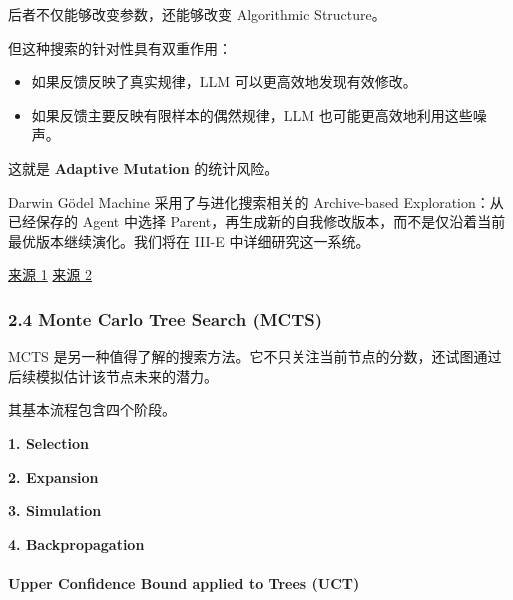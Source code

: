 后者不仅能够改变参数，还能够改变 Algorithmic Structure。

但这种搜索的针对性具有双重作用：

\begin{itemize}
\tightlist
\item
  如果反馈反映了真实规律，LLM 可以更高效地发现有效修改。
\item
  如果反馈主要反映有限样本的偶然规律，LLM 也可能更高效地利用这些噪声。
\end{itemize}

这就是 \textbf{Adaptive Mutation} 的统计风险。

Darwin Gödel Machine 采用了与进化搜索相关的 Archive-based Exploration：从已经保存的 Agent 中选择 Parent，再生成新的自我修改版本，而不是仅沿着当前最优版本继续演化。我们将在 III-E 中详细研究这一系统。

\href{https://arxiv.org/abs/2505.22954}{来源 1} \href{https://openreview.net/pdf?id=pUpzQZTvGY}{来源 2}

\hypertarget{part-3-40-0001-monte-carlo-tree-search-mcts}{%
\subsubsection{2.4 Monte Carlo Tree Search (MCTS)}\label{part-3-40-0001-monte-carlo-tree-search-mcts}}

MCTS 是另一种值得了解的搜索方法。它不只关注当前节点的分数，还试图通过后续模拟估计该节点未来的潜力。

其基本流程包含四个阶段。

\textbf{1. Selection}


\textbf{2. Expansion}


\textbf{3. Simulation}


\textbf{4. Backpropagation}


\hypertarget{part-3-40-0001-upper-confidence-bound-applied-to-trees-uct}{%
\paragraph{Upper Confidence Bound applied to Trees (UCT)}\label{part-3-40-0001-upper-confidence-bound-applied-to-trees-uct}}

